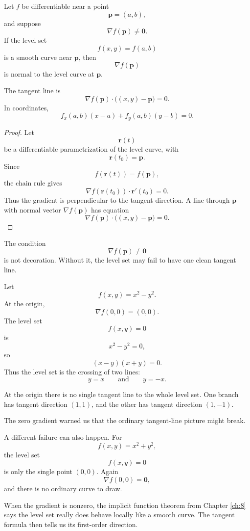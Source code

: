 \begin{theorem}
Let \(f\) be differentiable near a point
\[
    \mathbf p=(a,b),
\]
and suppose
\[
    \nabla f(\mathbf p)\ne \mathbf 0.
\]
If the level set
\[
    f(x,y)=f(a,b)
\]
is a smooth curve near \(\mathbf p\), then
\[
\boxed{
    \nabla f(\mathbf p)
}
\]
is normal to the level curve at \(\mathbf p\).

The tangent line is
\[
\boxed{
    \nabla f(\mathbf p)\cdot \bigl((x,y)-\mathbf p\bigr)=0.
}
\]
In coordinates,
\[
\boxed{
    f_x(a,b)(x-a)+f_y(a,b)(y-b)=0.
}
\]
\end{theorem}

\begin{proof}
Let
\[
    \mathbf r(t)
\]
be a differentiable parametrization of the level curve, with
\[
    \mathbf r(t_0)=\mathbf p.
\]
Since
\[
    f(\mathbf r(t))=f(\mathbf p),
\]
the chain rule gives
\[
    \nabla f(\mathbf r(t_0))\cdot \mathbf r'(t_0)=0.
\]
Thus the gradient is perpendicular to the tangent direction.  A line through
\(\mathbf p\) with normal vector \(\nabla f(\mathbf p)\) has equation
\[
    \nabla f(\mathbf p)\cdot \bigl((x,y)-\mathbf p\bigr)=0.
\]
\end{proof}

The condition
\[
    \nabla f(\mathbf p)\ne\mathbf 0
\]
is not decoration.  Without it, the level set may fail to have one clean tangent line.

\begin{example}
Let
\[
    f(x,y)=x^2-y^2.
\]
At the origin,
\[
    \nabla f(0,0)=(0,0).
\]
The level set
\[
    f(x,y)=0
\]
is
\[
    x^2-y^2=0,
\]
so
\[
    (x-y)(x+y)=0.
\]
Thus the level set is the crossing of two lines:
\[
    y=x
    \qquad\text{and}\qquad
    y=-x.
\]

At the origin there is no single tangent line to the whole level set.  One branch has
tangent direction \((1,1)\), and the other has tangent direction \((1,-1)\).

The zero gradient warned us that the ordinary tangent-line picture might break.
\end{example}

A different failure can also happen.  For
\[
    f(x,y)=x^2+y^2,
\]
the level set
\[
    f(x,y)=0
\]
is only the single point \((0,0)\).  Again
\[
    \nabla f(0,0)=\mathbf 0,
\]
and there is no ordinary curve to draw.

When the gradient is nonzero, the implicit function theorem from Chapter \ref{ch:8}
says the level set really does behave locally like a smooth curve.  The tangent formula
then tells us its first-order direction.


